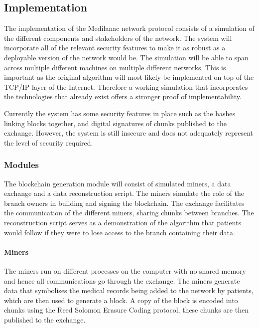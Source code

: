 \documentclass[]{article}
\let\oldparagraph\paragraph
\renewcommand{\paragraph}[1]{\oldparagraph{#1}\mbox{}}
\begin{document}
\hypertarget{header-n96}{%
\subsection{Implementation}\label{header-n96}}

The implementation of the Medilanac network protocol consists of a
simulation of the different components and stakeholders of the network.
The system will incorporate all of the relevant security features to
make it as robust as a deployable version of the network would be. The
simulation will be able to span across multiple different machines on
multiple different networks. This is important as the original algorithm
will most likely be implemented on top of the TCP/IP layer of the
Internet. Therefore a working simulation that incorporates the
technologies that already exist offers a stronger proof of
implementability.

Currently the system has some security features in place such as the
hashes linking blocks together, and digital signatures of chunks
published to the exchange. However, the system is still insecure and
does not adequately represent the level of security required.

\hypertarget{header-n99}{%
\subsubsection{Modules}\label{header-n99}}

The blockchain generation module will consist of simulated miners, a
data exchange and a data reconstruction script. The miners simulate the
role of the branch owners in building and signing the blockchain. The
exchange facilitates the communication of the different miners, sharing
chunks between branches. The reconstruction script serves as a
demonstration of the algorithm that patients would follow if they were
to lose access to the branch containing their data.

\hypertarget{header-n101}{%
\paragraph{Miners}\label{header-n101}}

The miners run on different processes on the computer with no shared
memory and hence all communications go through the exchange. The miners
generate data that symbolises the medical records being added to the
network by patients, which are then used to generate a block. A copy of
the block is encoded into chunks using the Reed Solomon Erasure Coding
protocol, these chunks are then published to the exchange.
\end{document}
